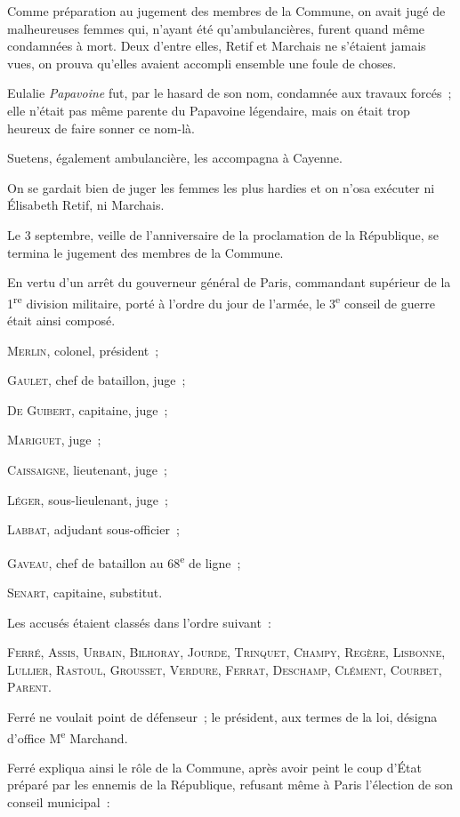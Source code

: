 \documentclass[french,twoside]{book} %
\newenvironment{quoteblock}%
  {\begin{quoting}}
  {\end{quoting}}
\newenvironment{quotebar}{%
    \def\FrameCommand{{\color{rubric!10!}\vrule width 0.5em} \hspace{0.9em}}%
    \def\OuterFrameSep{\itemsep} %
    \MakeFramed {\advance\hsize-\width \FrameRestore}
  }%
  {%
    \endMakeFramed
  }
\renewenvironment{quoteblock}%
  {%
    \savenotes
    \setstretch{0.9}
    \normalfont
    \begin{quotebar}
  }
  {%
    \end{quotebar}
    \spewnotes
  }
\begin{document}
Comme préparation au jugement des membres de la Commune, on avait jugé de malheureuses femmes qui, n’ayant été qu’ambulancières, furent quand même condamnées à mort. Deux d’entre elles, Retif et Marchais ne s’étaient jamais vues, on prouva qu’elles avaient accompli ensemble une foule de choses.\par
Eulalie \emph{Papavoine} fut, par le hasard de son nom, condamnée aux travaux forcés ; elle n’était  pas même parente du Papavoine légendaire, mais on était trop heureux de faire sonner ce nom-là.\par
Suetens, également ambulancière, les accompagna à Cayenne.\par
On se gardait bien de juger les femmes les plus hardies et on n’osa exécuter ni Élisabeth Retif, ni Marchais.\par
Le 3 septembre, veille de l’anniversaire de la proclamation de la République, se termina le jugement des membres de la Commune.\par
En vertu d’un arrêt du gouverneur général de Paris, commandant supérieur de la 1\textsuperscript{re} division militaire, porté à l’ordre du jour de l’armée, le 3\textsuperscript{e} conseil de guerre était ainsi composé.\par

\begin{quoteblock}
 \noindent M{\scshape erlin}, colonel, président ;\par
 G{\scshape aulet}, chef de bataillon, juge ;\par
 D{\scshape e} G{\scshape uibert}, capitaine, juge ;\par
 M{\scshape ariguet}, juge ;\par
 C{\scshape aissaigne}, lieutenant, juge ;\par
 L{\scshape éger}, sous-lieulenant, juge ;\par
 L{\scshape abbat}, adjudant sous-officier ;\par
 G{\scshape aveau}, chef de bataillon au 68\textsuperscript{e} de ligne ;\par
 S{\scshape enart}, capitaine, substitut.
 \end{quoteblock}

\noindent Les accusés étaient classés dans l’ordre suivant :\par
F{\scshape erré}, A{\scshape ssis}, U{\scshape rbain}, B{\scshape ilhoray}, J{\scshape ourde}, T{\scshape rinquet}, C{\scshape hampy}, R{\scshape egère}, L{\scshape isbonne}, L{\scshape ullier}, R{\scshape astoul}, G{\scshape rousset}, V{\scshape erdure}, F{\scshape errat}, D{\scshape eschamp}, C{\scshape lément}, C{\scshape ourbet}, P{\scshape arent}.\par
 Ferré ne voulait point de défenseur ; le président, aux termes de la loi, désigna d’office M\textsuperscript{e} Marchand.\par
Ferré expliqua ainsi le rôle de la Commune, après avoir peint le coup d’État préparé par les ennemis de la République, refusant même à Paris l’élection de son conseil municipal :\par
\end{document}
